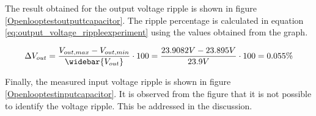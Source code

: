 The result obtained for the output voltage ripple is shown in figure \ref{Openlooptestoutputtcapacitor}. The ripple percentage is calculated in equation \ref{eq:output_voltage_rippleexperiment} using the values obtained from the graph. 

\begin{equation} \label{eq:output_voltage_rippleexperiment}
\Delta V_{out} = \frac{V_{out,max}-V_{out,min}}{\widebar{V_{out}}} \cdot 100 = \frac{23.9082V - 23.895V }{23.9V} \cdot 100 = 0.055\%
\end{equation}

Finally, the measured input voltage ripple is shown in figure \ref{Openlooptestinputcapacitor}. It is observed from the figure that it is not possible to identify the voltage ripple. This be addressed in the discussion. 

